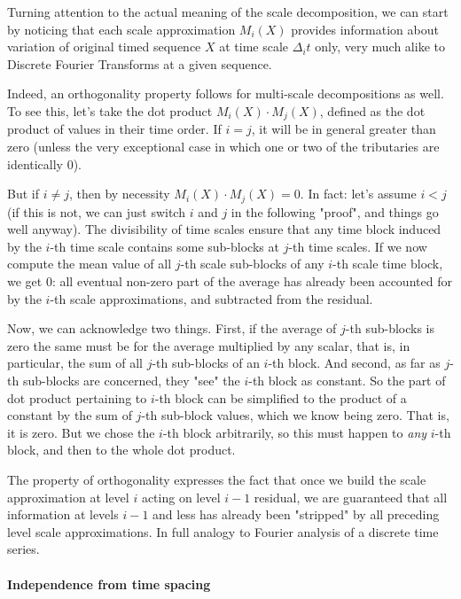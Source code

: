 \documentclass[a4paper,10pt]{book}
\begin{document}
Turning attention to the actual meaning of the scale decomposition, we can start by noticing that each scale approximation $M_{i}(X)$ provides information about variation of original timed sequence $X$ at time scale $\Delta_{i} t$ only, very much alike to Discrete Fourier Transforms at a given sequence.

Indeed, an orthogonality property follows for multi-scale decompositions as well. To see this, let's take the dot product $M_{i}(X) \cdot M_{j}(X)$, defined as the dot product of values in their time order. If $i = j$, it will be in general greater than zero (unless the very exceptional case in which one or two of the tributaries are identically 0). 

But if $i \ne j$, then by necessity $M_{i}(X) \cdot M_{j}(X) = 0$. In fact: let's assume $i < j$ (if this is not, we can just switch $i$ and $j$ in the following "proof", and things go well anyway). The divisibility of time scales ensure that any time block induced by the $i$-th time scale contains some sub-blocks at $j$-th time scales. If we now compute the mean value of all $j$-th scale sub-blocks of any $i$-th scale time block, we get 0: all eventual non-zero part of the average has already been accounted for by the $i$-th scale approximations, and subtracted from the residual.

Now, we can acknowledge two things. First, if the average of $j$-th sub-blocks is zero the same must be for the average multiplied by any scalar, that is, in particular, the sum of all $j$-th sub-blocks of an $i$-th block. And second, as far as $j$-th sub-blocks are concerned, they "see" the $i$-th block as constant. So the part of dot product pertaining to $i$-th block can be simplified to the product of a constant by the sum of $j$-th sub-block values, which we know being zero. That is, it is zero. But we chose the $i$-th block arbitrarily, so this must happen to \emph{any} $i$-th block, and then to the whole dot product.

The property of orthogonality expresses the fact that once we build the scale approximation at level $i$ acting on level $i-1$ residual, we are guaranteed that all information at levels $i-1$ and less has already been "stripped" by all preceding level scale approximations. In full analogy to Fourier analysis of a discrete time series.


\paragraph{Independence from time spacing}
\end{document}
